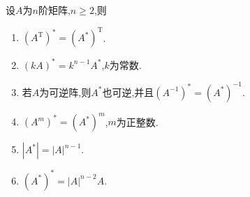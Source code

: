 \documentclass[lang=cn,newtx,10pt,scheme=chinese]{elegantbook}
\begin{document}
\begin{proposition}[伴随矩阵的性质]\label{proposition:伴随矩阵的性质}
设\(A\)为\(n\)阶矩阵,\(n\geq 2\),则
\begin{enumerate}
\item\label{伴随矩阵的性质1}  \((A^{\mathrm{T}})^* = (A^*)^{\mathrm{T}}\).

\item  \((kA)^* = k^{n - 1}A^*\),\(k\)为常数.

\item\label{伴随矩阵的性质3}  若$A$为可逆阵,则$A^*$也可逆,并且\((A^{-1})^* = (A^*)^{-1}\).

\item  \((A^{m})^* = (A^*)^{m}\),\(m\)为正整数.

\item\label{伴随矩阵的性质5}  \(|A^*| = |A|^{n - 1}\).

\item  \((A^*)^* = |A|^{n - 2}A\).
\end{enumerate}
\end{proposition}
\end{document}
